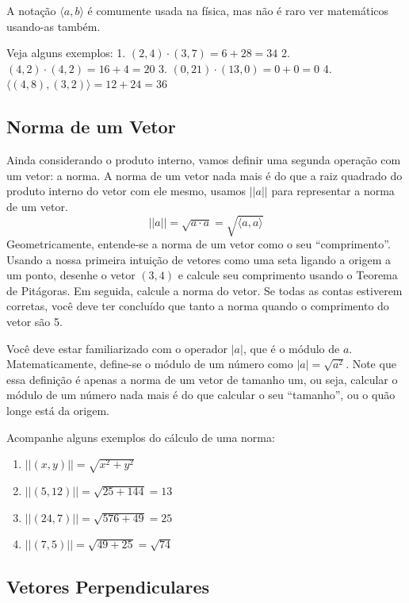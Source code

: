 \documentclass[
  portuguese,
  letterpaper,
  DIV=11,
  numbers=noendperiod]{scrreport}
\providecommand{\tightlist}{%
  \setlength{\itemsep}{0pt}\setlength{\parskip}{0pt}}
\begin{document}
A notação \(\langle a,b \rangle\) é comumente usada na física, mas não é
raro ver matemáticos usando-as também.

Veja alguns exemplos: 1. \((2,4) \cdot (3,7) = 6+28=34\) 2.
\((4,2) \cdot (4,2) = 16+4 = 20\) 3. \((0,21) \cdot (13, 0) = 0+0=0\) 4.
\(\langle (4,8),(3,2) \rangle = 12+24=36\)

\subsection{Norma de um Vetor}\label{norma-de-um-vetor}

Ainda considerando o produto interno, vamos definir uma segunda operação
com um vetor: a norma. A norma de um vetor nada mais é do que a raiz
quadrado do produto interno do vetor com ele mesmo, usamos \(|| a ||\)
para representar a norma de um vetor. \[
||a|| = \sqrt{a \cdot a} = \sqrt{\langle a,a \rangle}
\] Geometricamente, entende-se a norma de um vetor como o seu
``comprimento''. Usando a nossa primeira intuição de vetores como uma
seta ligando a origem a um ponto, desenhe o vetor \((3,4)\) e calcule
seu comprimento usando o Teorema de Pitágoras. Em seguida, calcule a
norma do vetor. Se todas as contas estiverem corretas, você deve ter
concluído que tanto a norma quando o comprimento do vetor são 5.

Você deve estar familiarizado com o operador \(|a|\), que é o módulo de
\(a\). Matematicamente, define-se o módulo de um número como
\(|a| = \sqrt{a^2}\). Note que essa definição é apenas a norma de um
vetor de tamanho um, ou seja, calcular o módulo de um número nada mais é
do que calcular o seu ``tamanho'', ou o quão longe está da origem.

Acompanhe alguns exemplos do cálculo de uma norma:

\begin{enumerate}
\def\labelenumi{\arabic{enumi}.}
\tightlist
\item
  \(||(x,y)|| = \sqrt{x^2+y^2}\)
\item
  \(||(5,12)|| = \sqrt{25+144} = 13\)
\item
  \(||(24, 7)|| = \sqrt{576+49}=25\)
\item
  \(||(7,5)|| = \sqrt{49+25}=\sqrt{74}\)
\end{enumerate}

\subsection{Vetores Perpendiculares}\label{vetores-perpendiculares}
\end{document}
